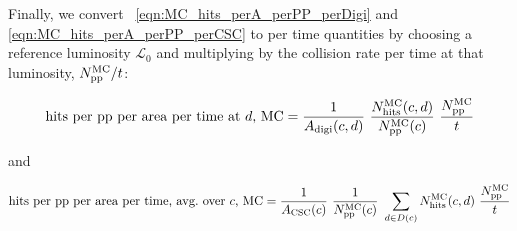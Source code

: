Finally, we convert \Eq~\ref{eqn:MC_hits_perA_perPP_perDigi} and \ref{eqn:MC_hits_perA_perPP_perCSC} to per time quantities by choosing a reference luminosity $\mathcal{L}_0$ and multiplying by the \pp collision rate per time at that luminosity, $N_\text{\ensuremath{\mathrm{p}}\ensuremath{\mathrm{p}}}^\text{MC}/t$:

\begin{equation}
	\label{eqn:MC_hits_perA_perT_perDigi}
\text{hits per \pp per area per time at $d$, MC} = 	\frac{1}{A_\text{digi}(c, d)}  \  \frac{N_\text{hits}^\text{MC}(c, d)}{N_\text{\pp}^\text{MC}(c)}  \  \frac{N_\text{\pp}^\text{MC}}{t} 
\end{equation}

and 

\begin{equation}
	\label{eqn:MC_hits_perA_perT_perCSC}
\text{hits per \pp per area per time, avg.\ over $c$, MC} = 
    \frac{1}{A_\text{CSC}(c)}  \  \frac{1}{N_\text{\pp}^\text{MC}(c)}  \  \sum_{d\in D(c)}{N_\text{hits}^\text{MC}(c, d)}  \  \frac{N_\text{\pp}^\text{MC}}{t} 
\end{equation}
 
